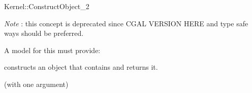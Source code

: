 \begin{ccRefFunctionObjectConcept}{Kernel::ConstructObject_2}
\begin{ccDeprecated}
{\em Note} : this concept is deprecated since CGAL VERSION HERE and type safe ways should be preferred. 

A model for this must provide:


{constructs an object that contains  and returns it.}

\ccRefines
{} (with one argument)

\ccSeeAlso
 \\
 \\
 \\
 \\
  \\
\end{ccDeprecated}
\end{ccRefFunctionObjectConcept}
